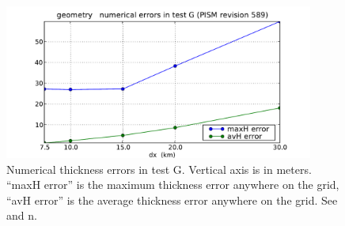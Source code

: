 \documentclass[11pt,final]{amsart}
\begin{document}

\begin{figure}[ht]
\includegraphics[width=4.0in,keepaspectratio=true]{figs/thickerrs_G}
\caption{Numerical thickness errors in test G.  Vertical axis is in meters. ``maxH error'' is the maximum thickness error anywhere on the grid, ``avH error'' is the average thickness error anywhere on the grid.  See \cite{BBL} and \cite{BLKCB}n.}
\label{fig:thickerrsG}
\end{figure}
\end{document}
